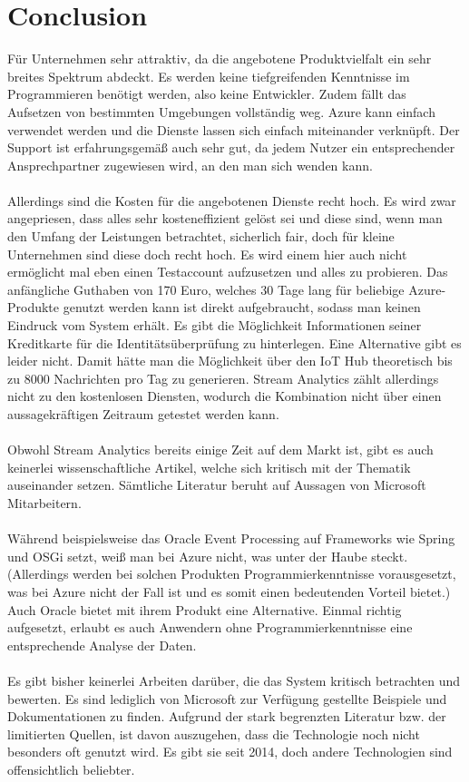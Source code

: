 \section{Conclusion}
Für Unternehmen sehr attraktiv, da die angebotene Produktvielfalt ein sehr breites Spektrum abdeckt. Es werden keine tiefgreifenden Kenntnisse im Programmieren benötigt werden, also keine Entwickler. Zudem fällt das Aufsetzen von bestimmten Umgebungen vollständig weg. Azure kann einfach verwendet werden und die Dienste lassen sich einfach miteinander verknüpft. Der Support ist erfahrungsgemäß auch sehr gut, da jedem Nutzer ein entsprechender Ansprechpartner zugewiesen wird, an den man sich wenden kann.\\ \\Allerdings sind die Kosten für die angebotenen Dienste recht hoch. Es wird zwar angepriesen, dass alles sehr kosteneffizient gelöst sei und diese sind, wenn man den Umfang der Leistungen betrachtet, sicherlich fair, doch für kleine Unternehmen sind diese doch recht hoch. Es wird einem hier auch nicht ermöglicht mal eben einen Testaccount aufzusetzen und alles zu probieren. Das anfängliche Guthaben von 170 Euro, welches 30 Tage lang für beliebige Azure-Produkte genutzt werden kann ist direkt aufgebraucht, sodass man keinen Eindruck vom System erhält. Es gibt die Möglichkeit Informationen seiner Kreditkarte für die Identitätsüberprüfung zu hinterlegen. Eine Alternative gibt es leider nicht. Damit hätte man die Möglichkeit über den IoT Hub theoretisch bis zu 8000 Nachrichten pro Tag zu generieren. Stream Analytics zählt allerdings nicht zu den kostenlosen Diensten, wodurch die Kombination nicht über einen aussagekräftigen Zeitraum getestet werden kann.\\ \\ Obwohl Stream Analytics bereits einige Zeit auf dem Markt ist, gibt es auch keinerlei wissenschaftliche Artikel, welche sich kritisch mit der Thematik auseinander setzen. Sämtliche Literatur beruht auf Aussagen von Microsoft Mitarbeitern.\\ \\Während beispielsweise das Oracle Event Processing auf Frameworks wie Spring und OSGi setzt, weiß man bei Azure nicht, was unter der Haube steckt. (Allerdings werden bei solchen Produkten Programmierkenntnisse vorausgesetzt, was bei Azure nicht der Fall ist und es somit einen bedeutenden Vorteil bietet.) Auch Oracle bietet mit ihrem Produkt eine Alternative. Einmal richtig aufgesetzt, erlaubt es auch Anwendern ohne Programmierkenntnisse eine entsprechende Analyse der Daten.\\ \\Es gibt bisher keinerlei Arbeiten darüber, die das System kritisch betrachten und bewerten. Es sind lediglich von Microsoft zur Verfügung gestellte Beispiele und Dokumentationen zu finden. Aufgrund der stark begrenzten Literatur bzw. der limitierten Quellen, ist davon auszugehen, dass die Technologie noch nicht besonders oft genutzt wird. Es gibt sie seit 2014, doch andere Technologien sind offensichtlich beliebter.



\ifCLASSOPTIONcaptionsoff
  \newpage
\fi